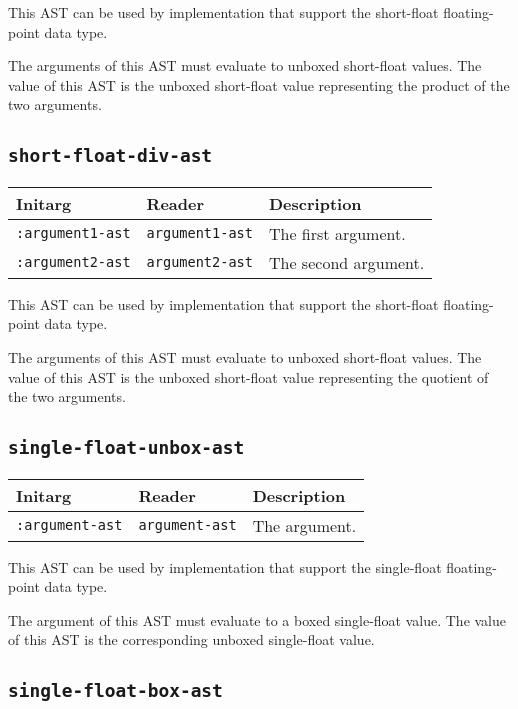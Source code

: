 This AST can be used by implementation that support the short-float
floating-point data type.  

The arguments of this AST must evaluate to unboxed short-float
values.  The value of this AST is the unboxed short-float value
representing the product of the two arguments.

\subsection{\texttt{short-float-div-ast}}
\label{sec-ast-short-float-div}

\begin{tabular}{|l|l|l|}
\hline
Initarg & Reader & Description\\
\hline\hline
\texttt{:argument1-ast} & \texttt{argument1-ast} & The first argument.\\
\hline
\texttt{:argument2-ast} & \texttt{argument2-ast} & The second argument.\\
\hline
\end{tabular}

This AST can be used by implementation that support the short-float
floating-point data type.  

The arguments of this AST must evaluate to unboxed short-float
values.  The value of this AST is the unboxed short-float value
representing the quotient of the two arguments.

\subsection{\texttt{single-float-unbox-ast}}
\label{sec-ast-single-float-unbox}

\begin{tabular}{|l|l|l|}
\hline
Initarg & Reader & Description\\
\hline\hline
\texttt{:argument-ast} & \texttt{argument-ast} & The argument.\\
\hline
\end{tabular}

This AST can be used by implementation that support the single-float
floating-point data type.  

The argument of this AST must evaluate to a boxed single-float value.
The value of this AST is the corresponding unboxed single-float value.

\subsection{\texttt{single-float-box-ast}}
\label{sec-ast-single-float-box}

